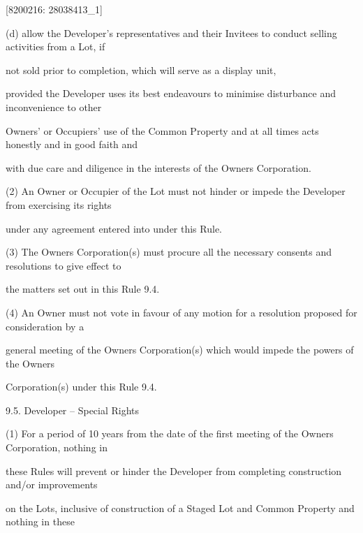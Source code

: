 \documentclass{article}
\begin{document}
\newpage
















{\fontsize{7.02}{1}[8200216: 28038413\_1] }

{\fontsize{9.962}{1}(d) allow the Developer's representatives and their Invitees to conduct selling activities from a Lot, if }

{\fontsize{10.02}{1}not sold prior to completion, which will serve as a display unit, }

{\fontsize{10.02}{1}provided the Developer uses its best endeavours to minimise disturbance and inconvenience to other }

{\fontsize{10.02}{1}Owners' or Occupiers' use of the Common Property and at all times acts honestly and in good faith and }

{\fontsize{10.02}{1}with due care and diligence in the interests of the Owners Corporation. }

{\fontsize{9.962}{1}(2) An Owner or Occupier of the Lot must not hinder or impede the Developer from exercising its rights }

{\fontsize{10.02}{1}under any agreement entered into under this Rule. }

{\fontsize{9.962}{1}(3) The Owners Corporation(s) must procure all the necessary consents and resolutions to give effect to }

{\fontsize{10.02}{1}the matters set out in this Rule 9.4. }

{\fontsize{9.962}{1}(4) An Owner must not vote in favour of any motion for a resolution proposed for consideration by a }

{\fontsize{10.02}{1}general meeting of the Owners Corporation(s) which would impede the powers of the Owners }

{\fontsize{10.02}{1}Corporation(s) under this Rule 9.4. }

{\fontsize{9.99}{1}9.5. Developer – Special Rights }

{\fontsize{9.962}{1}(1) For a period of 10 years from the date of the first meeting of the Owners Corporation, nothing in }

{\fontsize{10.02}{1}these Rules will prevent or hinder the Developer from completing construction and/or improvements }

{\fontsize{10.02}{1}on the Lots, inclusive of construction of a Staged Lot and Common Property and nothing in these }
\end{document}
